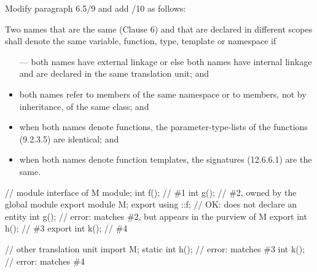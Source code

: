 \noindent
Modify paragraph 6.5/9 and add /10 as follows:
\begin{std.txt}
  \resetalinea[8]
  \alinea
  \addtocounter{footnote}{1}
  Two
  names that are the same (Clause 6) and that are declared in different scopes
  shall denote the same variable, function, type, template or namespace if
  \begin{itemize}
    \item[---] both names have external  linkage
      or else both names have internal linkage and are declared in
      the same translation unit; and

      \item both names refer to members of the same namespace or to members,
      not by inheritance, of the same class; and

      \item when both names denote functions, the parameter-type-lists of the
      functions (9.2.3.5) are identical; and

      \item when both names denote function templates, the signatures (12.6.6.1)
      are the same.
  \end{itemize}

  \alinea
  \color{addclr}
  \begin{example}
    \begin{codeblock}
      // module interface of M
      module;
      int f();            // \#1
      int g();            // \#2, owned by the global module
      export module M;
      export using ::f;   // OK: does not declare an entity
      int g();            // error: matches \#2, but appears in the purview of M
      export int h();     // \#3
      export int k();     // \#4

      // other translation unit
      import M;
      static int h();     // error: matches \#3
      int k();            // error: matches \#4
    \end{codeblock}
  \end{example}
\end{std.txt}


